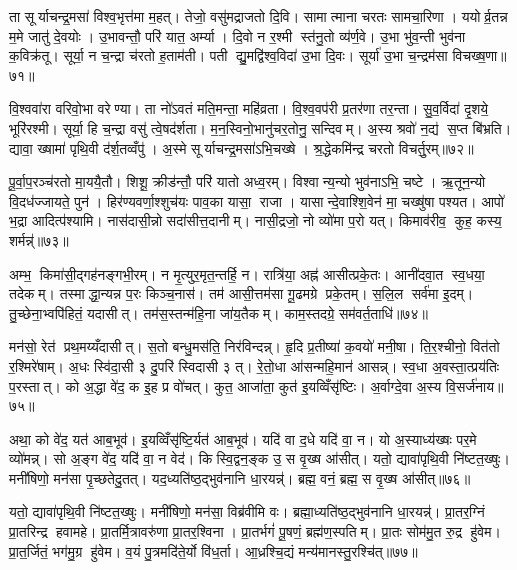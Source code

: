 ता सूर्याचन्द्र॒मसा॑ विश्व॒भृत्त॑मा म॒हत्। तेजो॒ वसु॑मद्राजतो दि॒वि। सामात्माना चरतः सामचा॒रिणा। ययोर्व्र॒तन्न म॒मे जातु॑ दे॒वयोः। उ॒भावन्तौ॒ परि॑ यात॒ अर्म्या। दि॒वो न र॒श्मी स्त॑नु॒तो व्य॑र्ण॒वे। उ॒भा भु॑व॒न्ती भुव॑ना क॒विक्र॑तू। सूर्या॒ न च॒न्द्रा च॑रतो ह॒ताम॑ती। पती द्यु॒मद्वि॑श्व॒विदा॑ उ॒भा दि॒वः। सूर्या॑ उ॒भा च॒न्द्रम॑सा विचख्ष॒णा॥७१॥

वि॒श्ववा॑रा वरिवो॒भा वरेण्या। ता नो॑ऽवतं मति॒मन्ता॒ महि॑व्रता। वि॒श्व॒वप॑री प्र॒तर॑णा तर॒न्ता। सु॒व॒र्विदा॑ दृ॒शये॒ भूरि॑रश्मी। सूर्या॒ हि च॒न्द्रा वसु॑ त्वे॒षद॑र्शता। म॒न॒स्विनो॒भानु॑चर॒तोनु॒ सन्दिवम्। अ॒स्य श्रवो॑ न॒द्य॑ स॒प्त बि॑भ्रति। द्यावा॒ ख्षामा॑ पृथि॒वी द॑र्\mbox{}श॒तव्वँपु॑। अ॒स्मे सूर्याचन्द्र॒मसा॑ऽभि॒चख्षे। श्र॒द्धेकमि॑न्द्र चरतो विचर्तु॒रम्॥७२॥

पू॒र्वा॒प॒रञ्च॑रतो मा॒ययै॒तौ। शिशू॒ क्रीड॑न्तौ॒ परि॑ यातो अध्व॒रम्। विश्वान्य॒न्यो भुव॑नाऽभि॒ चष्टे। ऋ॒तून॒न्यो वि॒दध॑ज्जायते॒ पुन॑। हिर॑ण्यवर्णा॒श्शुच॑यः पाव॒का यासा॒ राजा। यासान्दे॒वाश्शि॒वेन॑ मा॒ चख्षु॑षा पश्यत। आपो॑ भ॒द्रा आदित्प॑श्यामि। नास॑दासी॒न्नो सदा॑सीत्त॒दानीम्। नासी॒द्रजो॒ नो व्यो॑मा प॒रो यत्। किमाव॑रीव॒ कुह॒ कस्य॒ शर्मन्न्॑॥७३॥

अम्भ॒ किमा॑सी॒द्गह॑नङ्गभी॒रम्। न मृ॒त्युर॒मृत॒न्तर्\mbox{}हि॒ न। रात्रि॑या॒ अह्न॑ आसीत्प्रके॒तः। आनी॑दवा॒त स्व॒धया॒ तदेकम्। तस्माद्धा॒न्यन्न प॒रः किञ्च॒नास॑। तम॑ आसी॒त्तम॑सा गू॒ढमग्रे प्रके॒तम्। स॒लि॒ल सर्व॑मा इ॒दम्। तु॒च्छेना॒भ्वपि॑हितं॒ यदासीत्। तम॑स॒स्तन्म॑हि॒ना जा॑य॒तैकम्। काम॒स्तदग्रे॒ सम॑वर्त॒ताधि॑॥७४॥

मन॑सो॒ रेत॑ प्रथ॒मय्यँदासीत्। स॒तो बन्धु॒मस॑ति॒ निर॑विन्दन्न्। हृ॒दि प्र॒तीष्या॑ क॒वयो॑ मनी॒षा। ति॒र॒श्चीनो॒ वित॑तो र॒श्मिरे॑षाम्। अ॒धः स्वि॑दा॒सी ३ दु॒परि॑ स्विदासी ३ त्। रे॒तो॒धा आ॑सन्महि॒मान॑ आसन्न्। स्व॒धा अ॒वस्ता॒त्प्रय॑तिः प॒रस्तात्। को अ॒द्धा वे॑द॒ क इ॒ह प्र वो॑चत्। कुत॒ आजा॑ता॒ कुत॑ इ॒यव्विँसृ॑ष्टिः। अ॒र्वाग्दे॒वा अ॒स्य वि॒सर्ज॑नाय॥७५॥

अथा॒ को वे॑द॒ यत॑ आब॒भूव॑। इ॒यव्विँसृ॑ष्टि॒र्यत॑ आब॒भूव॑। यदि॑ वा द॒धे यदि॑ वा॒ न। यो अ॒स्याध्य॑ख्षः पर॒मे व्यो॑मन्न्। सो अ॒ङ्ग वे॑द॒ यदि॑ वा॒ न वेद॑। किस्वि॒द्वन॒ङ्क उ॒ स वृ॒ख्ष आ॑सीत्। यतो॒ द्यावा॑पृथि॒वी नि॑ष्टत॒ख्षुः। मनी॑षिणो॒ मन॑सा पृ॒च्छतेदु॒तत्। यद॒ध्यति॑ष्ठ॒द्भुव॑नानि धा॒रयन्न्॑। ब्रह्म॒ वनं॒ ब्रह्म॒ स वृ॒ख्ष आ॑सीत्॥७६॥

यतो॒ द्यावा॑पृथि॒वी नि॑ष्टत॒ख्षुः। मनी॑षिणो॒ मन॑सा॒ विब्र॑वीमि वः। ब्रह्मा॒ध्यति॑ष्ठ॒द्भुव॑नानि धा॒रयन्न्॑। प्रा॒तर॒ग्निं प्रा॒तरिन्द्र हवामहे। प्रा॒तर्मि॒त्रावरु॑णा प्रा॒तर॒श्विना। प्रा॒तर्भगं॑ पू॒षणं॒ ब्रह्म॑ण॒स्पतिम्। प्रा॒तः सोम॑मु॒त रु॒द्र हु॑वेम। प्रा॒त॒र्जितं॒ भग॑मु॒ग्र हु॑वेम। व॒यं पु॒त्रमदि॑ते॒र्यो वि॑ध॒र्ता। आ॒ध्रश्चि॒द्यं मन्य॑मानस्तु॒रश्चि॑त्॥७७॥

